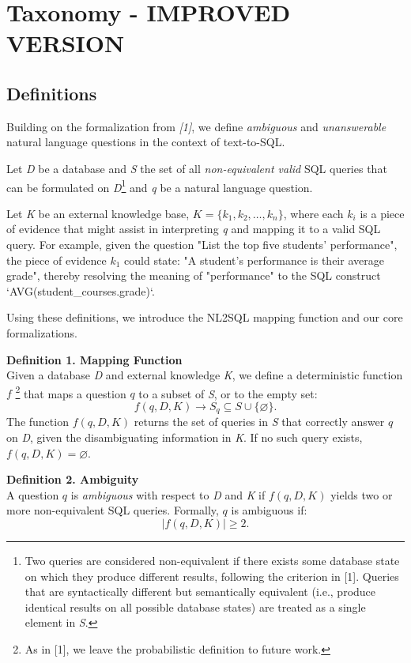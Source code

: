 \section{Taxonomy - IMPROVED VERSION}
\subsection{Definitions}

Building on the formalization from \textit{[1]}, we define \textit{ambiguous} and \emph{unanswerable} natural language questions in the context of text-to-SQL.

Let \textit{D} be a database and \textit{S} the set of all \textit{non-equivalent valid} SQL queries that can be formulated on \textit{D}\footnote{Two queries are considered non-equivalent if there exists some database state on which they produce different results, following the criterion in [1]. Queries that are syntactically different but semantically equivalent (i.e., produce identical results on all possible database states) are treated as a single element in \textit{S}.} and \textit{q} be a natural language question.

Let \textit{K} be an external knowledge base, \(\textit{K} = \{k_1, k_2, \ldots, k_n\}\), where each \(k_i\) is a piece of evidence that might assist in interpreting \textit{q} and mapping it to a valid SQL query. For example, given the question "List the top five students' performance", the piece of evidence \(k_1\) could state: "A student's performance is their average grade", thereby resolving the meaning of "performance" to the SQL construct `AVG(student\_courses.grade)`.

Using these definitions, we introduce the NL2SQL mapping function and our core formalizations.

\textbf{Definition 1. Mapping Function} \\
Given a database \textit{D} and external knowledge \textit{K}, we define a deterministic function \(f\) \footnote{As in [1], we leave the probabilistic definition to future work.} that maps a question \(q\) to a subset of \textit{S}, or to the empty set:
\[
f(q, D, K) \to S_q \subseteq S \cup \{\varnothing\}.
\]
The function \(f(q, D, K)\) returns the set of queries in \textit{S} that correctly answer \(q\) on \textit{D}, given the disambiguating information in \textit{K}. If no such query exists, \(f(q, D, K) = \varnothing\).

\textbf{Definition 2. Ambiguity} \\
A question \(q\) is \textit{ambiguous} with respect to \textit{D} and \textit{K} if \(f(q, D, K)\) yields two or more non-equivalent SQL queries. Formally, \(q\) is ambiguous if:
\[
\lvert f(q, D, K) \rvert \ge 2.
\]


